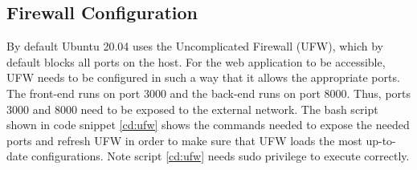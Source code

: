 \subsection{Firewall Configuration}
By default Ubuntu 20.04 uses the Uncomplicated Firewall (UFW)\cite{ubuntu-ufw}, which by default blocks all ports on the host. For the web application to be accessible, UFW needs to be configured in such a way that it allows the appropriate ports. The front-end runs on port 3000 and the back-end runs on port 8000. Thus, ports 3000 and 8000 need to be exposed to the external network. The bash script shown in code snippet \ref{cd:ufw} shows the commands needed to expose the needed ports and refresh UFW in order to make sure that UFW loads the most up-to-date configurations. Note script \ref{cd:ufw} needs sudo privilege to execute correctly.





% 